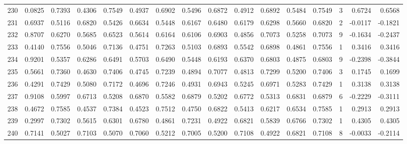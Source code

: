 \begin{tabular}{lrrrrrrrrrrrrrrr}
230 &      0.0825 &  0.7393 &  0.4306 &  0.7549 &  0.4937 &  0.6902 &  0.5496 &  0.6872 &  0.4912 &  0.6892 &   0.5484 &     0.7549 &      3 &                    0.6724 &                     0.6568 \\
231 &      0.6937 &  0.5116 &  0.6820 &  0.5426 &  0.6634 &  0.5448 &  0.6167 &  0.6480 &  0.6179 &  0.6298 &   0.5660 &     0.6820 &      2 &                   -0.0117 &                    -0.1821 \\
232 &      0.8707 &  0.6270 &  0.5685 &  0.6523 &  0.5614 &  0.6164 &  0.6106 &  0.6903 &  0.4856 &  0.7073 &   0.5258 &     0.7073 &      9 &                   -0.1634 &                    -0.2437 \\
233 &      0.4140 &  0.7556 &  0.5046 &  0.7136 &  0.4751 &  0.7263 &  0.5103 &  0.6893 &  0.5542 &  0.6898 &   0.4861 &     0.7556 &      1 &                    0.3416 &                     0.3416 \\
234 &      0.9201 &  0.5357 &  0.6286 &  0.6491 &  0.5703 &  0.6490 &  0.5448 &  0.6193 &  0.6370 &  0.6803 &   0.4875 &     0.6803 &      9 &                   -0.2398 &                    -0.3844 \\
235 &      0.5661 &  0.7360 &  0.4630 &  0.7406 &  0.4745 &  0.7239 &  0.4894 &  0.7077 &  0.4813 &  0.7299 &   0.5200 &     0.7406 &      3 &                    0.1745 &                     0.1699 \\
236 &      0.4291 &  0.7429 &  0.5080 &  0.7172 &  0.4696 &  0.7246 &  0.4931 &  0.6943 &  0.5245 &  0.6971 &   0.5283 &     0.7429 &      1 &                    0.3138 &                     0.3138 \\
237 &      0.9108 &  0.5997 &  0.6713 &  0.5208 &  0.6870 &  0.5582 &  0.6879 &  0.5202 &  0.6772 &  0.5313 &   0.6831 &     0.6879 &      6 &                   -0.2229 &                    -0.3111 \\
238 &      0.4672 &  0.7585 &  0.4537 &  0.7384 &  0.4523 &  0.7512 &  0.4750 &  0.6822 &  0.5413 &  0.6217 &   0.6534 &     0.7585 &      1 &                    0.2913 &                     0.2913 \\
239 &      0.2997 &  0.7302 &  0.5615 &  0.6301 &  0.6780 &  0.4861 &  0.7231 &  0.4922 &  0.6821 &  0.5839 &   0.6766 &     0.7302 &      1 &                    0.4305 &                     0.4305 \\
240 &      0.7141 &  0.5027 &  0.7103 &  0.5070 &  0.7060 &  0.5212 &  0.7005 &  0.5200 &  0.7108 &  0.4922 &   0.6821 &     0.7108 &      8 &                   -0.0033 &                    -0.2114 \\

\end{tabular}
